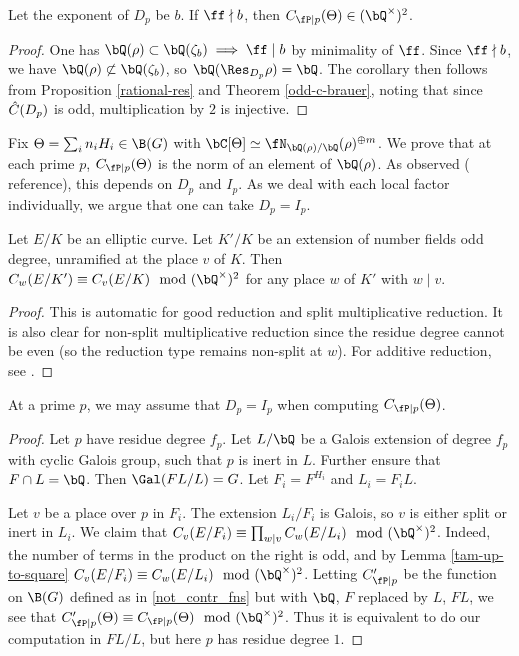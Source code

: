 \begin{cor}\label{rational-res-2}
    Let the exponent of $D_p$ be $b$. If $\ff \nmid b$, then $C_{\fP \mid p}(\Theta) \in (\bQ^{\times})^2$.
\end{cor}

\begin{proof}
    One has $\bQ(\rho) \subset \bQ(\zeta_b) \implies \ff \mid b$ by minimality of $\ff$. Since $\ff \nmid b$, we have $\bQ(\rho) \not\subset \bQ(\zeta_b)$, so $\bQ(\Res_{D_p} \rho) = \bQ$. The corollary then follows from Proposition \ref{rational-res} and Theorem \ref{odd-c-brauer}, noting that since $\hat{C}(D_p)$ is odd, multiplication by $2$ is injective. 
\end{proof}

Fix $\Theta = \sum_i n_i H_i \in \B(G)$ with $\bC[\Theta] \simeq \repnorm{\rho}^{\oplus m}$. We prove that at each prime $p$, $C_{\fP \mid p}(\Theta)$ is the norm of an element of $\bQ(\rho)$.  As observed ({\color{red} reference}), this depends on $D_p$ and $I_p$. As we deal with each local factor individually, we argue that one can take $D_p = I_p$.

\begin{lemma}\label{tam-up-to-square}
    Let $E / K$ be an elliptic curve. Let $K' / K$ be an extension of number fields odd degree, unramified at the place $v$ of $K$. Then $C_w(E / K') \equiv C_v(E / K) \mod (\bQ^{\times})^2$ for any place $w$ of $K'$ with $ w \mid v$. 
\end{lemma}

\begin{proof}
This is automatic for good reduction and split multiplicative reduction. It is also clear for non-split multiplicative reduction since the residue degree cannot be even (so the reduction type remains non-split at $w$). For additive reduction, see \cite[Lemma 3.12]{reg-const}.
\end{proof}

\begin{lemma}\label{DeqI}
    At a prime $p$, we may assume that $D_p = I_p$ when computing $C_{\fP \mid p}(\Theta)$. 
\end{lemma}

\begin{proof}
Let $p$ have residue degree $f_p$. Let $L / \bQ$ be a Galois extension of degree $f_p$ with cyclic Galois group, such that $p$ is inert in $L$. Further ensure that $F \cap L = \bQ$. Then $\Gal(FL / L) = G$. Let $F_i = F^{H_i}$ and $L_i = F_i L$.

Let $v$ be a place over $p$ in $F_i$. The extension $L_i / F_i$ is Galois, so $v$ is either split or inert in $L_i$.
We claim that $C_v(E / F_i) \equiv \prod_{w | v} C_w(E / L_i) \mod (\bQ^{\times})^2$. Indeed, the number of terms in the product on the right is odd, and by Lemma \ref{tam-up-to-square} $C_v(E / F_i) \equiv C_w(E / L_i) \mod (\bQ^{\times})^2$. 
Letting $C_{\fP \mid p}'$ be the function on $\B(G)$ defined as in \eqref{not_contr_fns} but with $\bQ$, $F$ replaced by $L$, $FL$, we see that $C_{\fP \mid p}'(\Theta) \equiv C_{\fP \mid p}(\Theta) \mod (\bQ^{\times})^2$. 
Thus it is equivalent to do our computation in $FL / L$, but here $p$ has residue degree $1$.
\end{proof}


